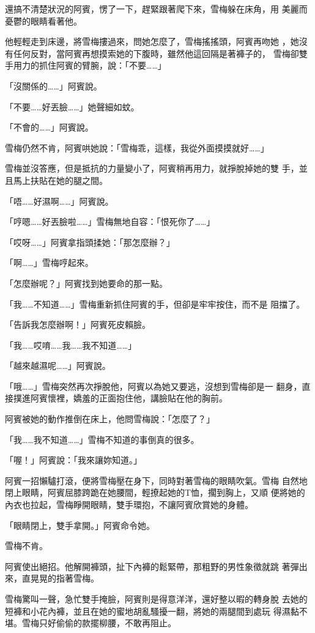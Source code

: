 還搞不清楚狀況的阿賓，愣了一下，趕緊跟著爬下來，雪梅躲在床角，用
美麗而憂鬱的眼睛看著他。

他輕輕走到床邊，將雪梅摟過來，問她怎麼了，雪梅搖搖頭，阿賓再吻她
，她沒有任何反對，當阿賓再想摸索她的下腹時，雖然他這回隔是著褲子的，
雪梅卻雙手用力的抓住阿賓的臂腕，說：「不要……」

「沒關係的……」阿賓說。

「不要……好丟臉……」她聲細如蚊。

「不會的……」阿賓說。

雪梅仍然不肯，阿賓哄她說：「雪梅乖，這樣，我從外面摸摸就好……」

雪梅並沒答應，但是抵抗的力量變小了，阿賓稍再用力，就掙脫掉她的雙
手，並且馬上扶貼在她的腿之間。

「唔……好濕啊……」阿賓說。

「哼嗯……好丟臉啦……」雪梅無地自容：「恨死你了……」

「哎呀……」阿賓拿指頭揉她：「那怎麼辦？」

「啊……」雪梅哼起來。

「怎麼辦呢？」阿賓找到她要命的那一點。

「我……不知道……」雪梅重新抓住阿賓的手，但卻是牢牢按住，而不是
阻擋了。

「告訴我怎麼辦啊！」阿賓死皮賴臉。

「我……哎唷……我……我不知道……」

「越來越濕呢……」阿賓說。

「哦……」雪梅突然再次掙脫他，阿賓以為她又要逃，沒想到雪梅卻是一
翻身，直接撲進阿賓懷裡，嬌羞的正面抱住他，講臉貼在他的胸前。

阿賓被她的動作推倒在床上，他問雪梅說：「怎麼了？」

「我……我不知道……」雪梅不知道的事倒真的很多。

「喔！」阿賓說：「我來讓妳知道。」

阿賓一招懶驢打滾，便將雪梅壓在身下，同時對著雪梅的眼睛吹氣。雪梅
自然地閉上眼睛，阿賓屈膝跨跪在她腰間，輕撩起她的T恤，擱到胸上，又順
便將她的內衣也拉起，雪梅睜開眼睛，雙手環抱，不讓阿賓欣賞她的身體。

「眼睛閉上，雙手拿開。」阿賓命令她。

雪梅不肯。

阿賓使出絕招。他解開褲頭，扯下內褲的鬆緊帶，那粗野的男性象徵就跳
著彈出來，直晃晃的指著雪梅。

雪梅驚叫一聲，急忙雙手掩臉，阿賓則是得意洋洋，還好整以暇的轉身脫
去她的短褲和小花內褲，並且在她的蜜地胡亂騷擾一翻，將她的兩腿間到處玩
得濕黏不堪。雪梅只好偷偷的款擺柳腰，不敢再阻止。

